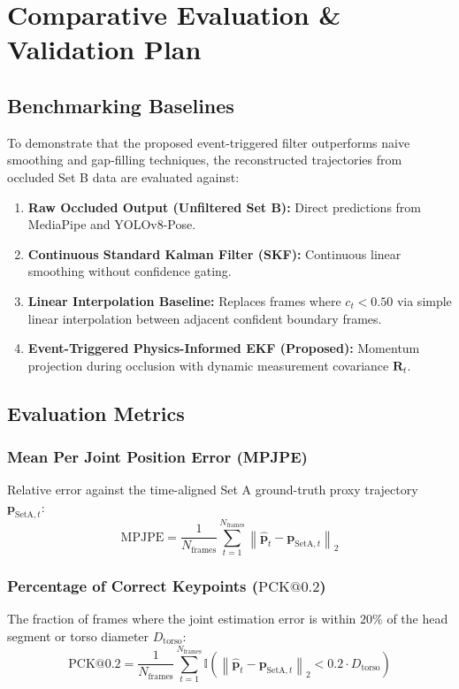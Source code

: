 \section{Comparative Evaluation \& Validation Plan}
\label{sec:evaluation}

\subsection{Benchmarking Baselines}
To demonstrate that the proposed event-triggered filter outperforms naive smoothing and gap-filling techniques, the reconstructed trajectories from occluded Set B data are evaluated against:
\begin{enumerate}
    \item \textbf{Raw Occluded Output (Unfiltered Set B):} Direct predictions from MediaPipe and YOLOv8-Pose.
    \item \textbf{Continuous Standard Kalman Filter (SKF):} Continuous linear smoothing without confidence gating.
    \item \textbf{Linear Interpolation Baseline:} Replaces frames where $c_t < 0.50$ via simple linear interpolation between adjacent confident boundary frames.
    \item \textbf{Event-Triggered Physics-Informed EKF (Proposed):} Momentum projection during occlusion with dynamic measurement covariance $\mathbf{R}_t$.
\end{enumerate}

\subsection{Evaluation Metrics}

\subsubsection{Mean Per Joint Position Error (MPJPE)}
Relative error against the time-aligned Set A ground-truth proxy trajectory $\mathbf{p}_{\text{SetA}, t}$:
\begin{equation}
    \text{MPJPE} = \frac{1}{N_{\text{frames}}} \sum_{t=1}^{N_{\text{frames}}} \left\| \hat{\mathbf{p}}_t - \mathbf{p}_{\text{SetA}, t} \right\|_2
\end{equation}

\subsubsection{Percentage of Correct Keypoints ($\text{PCK}@0.2$)}
The fraction of frames where the joint estimation error is within $20\%$ of the head segment or torso diameter $D_{\text{torso}}$:
\begin{equation}
    \text{PCK}@0.2 = \frac{1}{N_{\text{frames}}} \sum_{t=1}^{N_{\text{frames}}} \mathbb{I}\left( \left\| \hat{\mathbf{p}}_t - \mathbf{p}_{\text{SetA}, t} \right\|_2 < 0.2 \cdot D_{\text{torso}} \right)
\end{equation}

